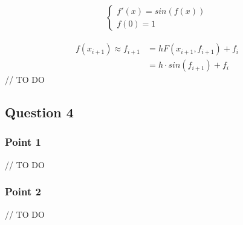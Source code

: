 \begin{equation}
	\begin{aligned}
	\begin{cases}
	f'(x) = sin(f(x))\\
	f(0) = 1
	\end{cases}
	\end{aligned}
\end{equation}

\begin{equation}
	\begin{aligned}
		f(x_{i+1}) \approx f_{i+1} &= hF(x_{i+1}, f_{i+1}) + f_i\\
		&= h\cdot sin(f_{i+1}) + f_i
	\end{aligned}
\end{equation}
// TO DO

\subsection{Question 4}

\subsubsection{Point 1}

// TO DO

\subsubsection{Point 2}

// TO DO